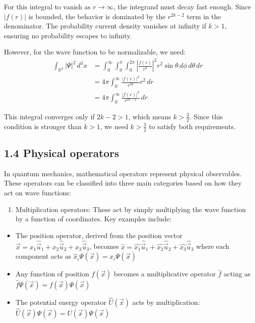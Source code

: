 \documentclass[10pt]{article}
\begin{document}
For this integral to vanish as $r \to \infty$, the integrand must decay fast enough. Since $|f(r)|$ is bounded, the behavior is dominated by the $r^{2k-2}$ term in the denominator. The probability current density vanishes at infinity if $k > 1$, ensuring no probability escapes to infinity.

However, for the wave function to be normalizable, we need:
\begin{align*}
\int_{\mathbb{R}^{3}} |\Psi|^2 \, d^3x &= \int_0^\infty \int_0^\pi \int_0^{2\pi} \left|\frac{f(r)}{r^k}\right|^2 r^2 \sin\theta \, d\phi \, d\theta \, dr \\
&= 4\pi \int_0^\infty \frac{|f(r)|^2}{r^{2k}} r^2 \, dr \\
&= 4\pi \int_0^\infty \frac{|f(r)|^2}{r^{2k-2}} \, dr
\end{align*}

This integral converges only if $2k-2 > 1$, which means $k > \frac{3}{2}$. Since this condition is stronger than $k > 1$, we need $k > \frac{3}{2}$ to satisfy both requirements.

\subsection*{1.4 Physical operators}
In quantum mechanics, mathematical operators represent physical observables. These operators can be classified into three main categories based on how they act on wave functions:

\begin{enumerate}
  \item Multiplication operators: These act by simply multiplying the wave function by a function of coordinates. Key examples include:
\end{enumerate}

\begin{itemize}
  \item The position operator, derived from the position vector $\vec{x}=x_{1} \hat{\vec{u}}_{1}+x_{2} \hat{\vec{u}}_{2}+x_{3} \hat{\vec{u}}_{3}$, becomes $\hat{x}=\hat{x_{1}} \hat{\vec{u}}_{1}+\hat{x_{2}} \hat{\vec{u}}_{2}+\hat{x_{3}} \hat{\vec{u}}_{3}$ where each component acts as $\hat{x}_i\Psi(\vec{x}) = x_i\Psi(\vec{x})$
  \item Any function of position $f(\vec{x})$ becomes a multiplicative operator $\hat{f}$ acting as $\hat{f}\Psi(\vec{x}) = f(\vec{x})\Psi(\vec{x})$
  \item The potential energy operator $\hat{U}(\vec{x})$ acts by multiplication: $\hat{U}(\vec{x})\Psi(\vec{x}) = U(\vec{x})\Psi(\vec{x})$
\end{itemize}
\end{document}
